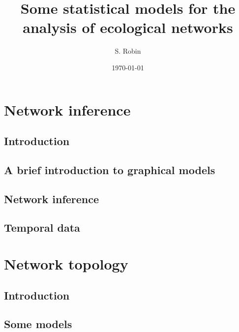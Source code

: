\documentclass[12pt]{report}
\begin{document}
\title{Some statistical models for the analysis of ecological networks}

\author{S. Robin}

\date{\today}

\maketitle

\abstract{}

\tableofcontents

\chapter{Network inference}
\section{Introduction} 
\section{A brief introduction to graphical models} 
\section{Network inference} 
\section{Temporal data} 

\chapter{Network topology}
\section{Introduction} 
\section{Some models} 
\end{document}
